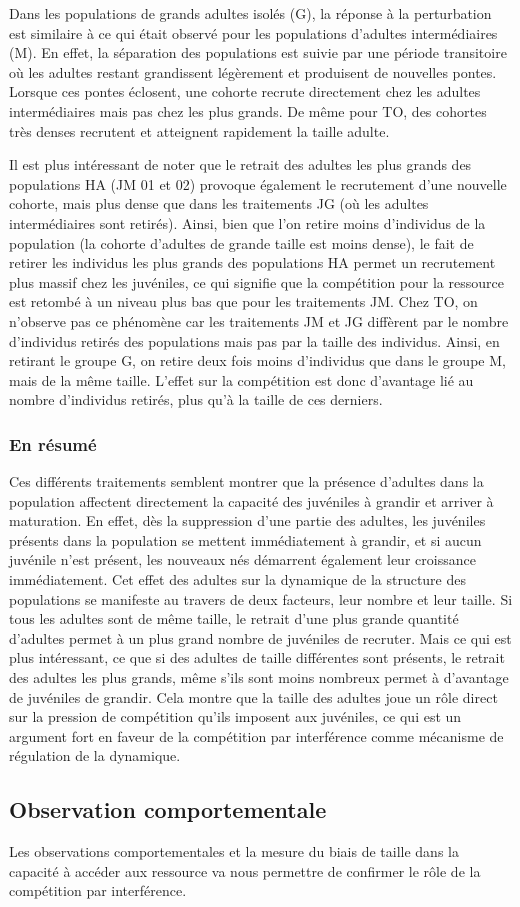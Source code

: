 Dans les populations de grands adultes isolés (G), la réponse à la perturbation
est similaire à ce qui était observé pour les populations d'adultes
intermédiaires (M). En effet, la séparation des populations est suivie par une
période transitoire où les adultes restant grandissent légèrement et produisent
de nouvelles pontes. Lorsque ces pontes éclosent, une cohorte recrute
directement chez les adultes intermédiaires mais pas chez les plus grands. De
même pour TO, des cohortes très denses recrutent et atteignent rapidement la
taille adulte. 

Il est plus intéressant de noter que le retrait des adultes les plus grands des
populations HA  (JM 01 et 02) provoque également le recrutement d'une nouvelle
cohorte, mais plus dense que dans les traitements JG (où les adultes
intermédiaires sont retirés). Ainsi, bien que l'on retire moins d'individus
de la population (la cohorte d'adultes de grande taille est moins dense), le
fait de retirer les individus les plus grands des populations HA permet un
recrutement plus massif chez les juvéniles, ce qui signifie que la compétition
pour la ressource est retombé à un niveau plus bas que pour les traitements JM.
Chez TO, on n'observe pas ce phénomène car les traitements JM et JG diffèrent
par le nombre d'individus retirés des populations mais pas par la taille des
individus. Ainsi, en retirant le groupe G, on retire deux fois moins d'individus
que dans le groupe M, mais de la même taille. L'effet sur la compétition est
donc d'avantage lié au nombre d'individus retirés, plus qu'à la taille de ces
derniers. 

\subsubsection{En résumé}

Ces différents traitements semblent montrer que la présence d'adultes dans la
population affectent directement la capacité des juvéniles à grandir et arriver
à maturation. En effet, dès la suppression d'une partie des adultes, les
juvéniles présents dans la population se mettent immédiatement à grandir, et si
aucun juvénile n'est présent, les nouveaux nés démarrent également leur
croissance immédiatement. Cet effet des adultes sur la dynamique de la structure
des populations se manifeste au travers de deux facteurs, leur nombre et leur
taille. Si tous les adultes sont de même taille, le retrait d'une plus grande
quantité d'adultes permet à un plus grand nombre de juvéniles de recruter. Mais
ce qui est plus intéressant, ce que si des adultes de taille différentes sont
présents, le retrait des adultes les plus grands, même s'ils sont moins nombreux
permet à d'avantage de juvéniles de grandir. Cela montre que la taille des
adultes joue un rôle direct sur la pression de compétition qu'ils imposent aux
juvéniles, ce qui est un argument fort en faveur de la compétition par
interférence comme mécanisme de régulation de la dynamique. 

\subsection{Observation comportementale}

Les observations comportementales et la mesure du biais de taille dans la
capacité à accéder aux ressource va nous permettre de confirmer le rôle de la
compétition par interférence. 



